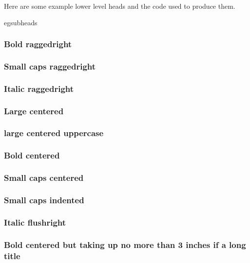 Here are some example lower level heads and the code used to produce them.



\newcommand*{\shortcenter}[1]{%
  \sethangfrom{\noindent ##1}%
  \normalfont\boldmath\bfseries
  \centering
  \parbox{3in}{\centering #1}\par}

\begin{egsource}{egsubheads}
\setsubsubsecheadstyle{\bfseries\raggedright}
    \subsubsection*{Bold raggedright}
\setsubsubsecheadstyle{\scshape\raggedright}
    \subsubsection*{Small caps raggedright}
\setsubsubsecheadstyle{\itshape\raggedright}
    \subsubsection*{Italic raggedright}
\setsubsubsecheadstyle{\Large\centering}
    \subsubsection*{Large centered}
\setsubsubsecheadstyle{\large\centering\MakeUppercase}
    \subsubsection*{large centered uppercase}
\setsubsubsecheadstyle{\bfseries\centering}
    \subsubsection*{Bold centered}
\setsubsubsecheadstyle{\scshape\centering}
    \subsubsection*{Small caps centered}
\setsubsubsecheadstyle{\scshape\raggedright}
    \subsubsection*{Small caps indented}
\setsubsubsecindent{0pt}
\setsubsubsecheadstyle{\itshape\raggedleft}
    \subsubsection*{Italic flushright}
\newcommand*{\shortcenter}[1]{%
  \sethangfrom{\noindent ##1}%
  \normalfont\boldmath\bfseries
  \centering
  \parbox{3in}{\centering #1}\par}
\setsubsubsecheadstyle{\shortcenter}
\subsubsection*{Bold centered but taking up no more than 3 inches
                if a long title}
\end{egsource}

